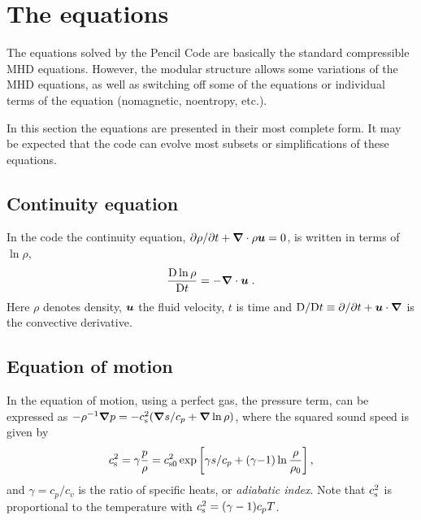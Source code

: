 \documentclass[\mydriver,12pt,twoside,notitlepage,a4paper]{article}
\newcommand{\De}      {\mathrm{D}}
\renewcommand{\vec}[1]{\mbox{\boldmath{$#1$}}}
\newcommand{\grad}    {\vec{\nabla}}
\newcommand{\Div}     {\vec{\nabla}\cdot}
\newcommand{\uv}            {\vec{u}}
\newcommand{\cs}            {c_{\rm s}}
\begin{document}

\section{The equations}

The equations solved by the {\sc Pencil Code} are basically the standard
compressible MHD equations. However, the modular structure allows
some variations of the MHD equations, as well as switching off
some of the equations or individual terms of the equation (nomagnetic,
noentropy, etc.).

In this section the equations are presented in their most complete form.
It may be expected that the code can evolve most subsets or
simplifications of these equations.


\subsection{Continuity equation}

In the code the continuity equation,
$\partial\rho/\partial t+\Div\rho\uv=0$,
is written in terms of $\ln\rho$,
\begin{equation}
  \frac{\De\ln\rho}{\De t}
  = - \Div\uv \; .
\end{equation}
Here $\rho$ denotes density, $\uv$ the fluid velocity, $t$ is time and
$\De/\De t \equiv \partial/\partial t + \uv\cdot\grad$ is the convective
derivative.


\subsection{Equation of motion}
\label{S-Eqn-of-motion}

In the equation of motion, using a perfect gas, the pressure term,
can be expressed as
$-\rho^{-1}\grad p = -\cs^2(\grad s/c_p+\grad\ln\rho)$,
where the squared sound speed is given by
\begin{equation}
  \cs^2 = \gamma \frac{p}{\rho}
        = c_{\rm s0}^2\exp\left[\gamma s/c_p
                                + (\gamma{-}1)\ln\frac{\rho}{\rho_0}
                               \right],
\label{EOSsimple}
\end{equation}
and $\gamma=c_p/c_v$ is the ratio of specific heats, or \emph{adiabatic index}.
Note that $\cs^2$ is proportional to the temperature with
$\cs^2=(\gamma-1)c_p T$.
\end{document}

